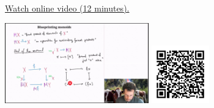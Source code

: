 
\begin{minipage}{10cm}
    \href{https://act4e-spring21.netlify.app/videos/spring2021-monads-b:blueprint-monoids.html}{Watch online video (12 minutes).}
        
    \href{https://act4e-spring21.netlify.app/videos/spring2021-monads-b:blueprint-monoids.html}{\includegraphics[height=3.5cm]{spring2021-monads-b:blueprint-monoids/thumbnails.jpg}}
    \href{https://act4e-spring21.netlify.app/videos/spring2021-monads-b:blueprint-monoids.html}{\includegraphics[height=2.5cm]{spring2021-monads-b:blueprint-monoids/qrcode.png}}
\end{minipage}

